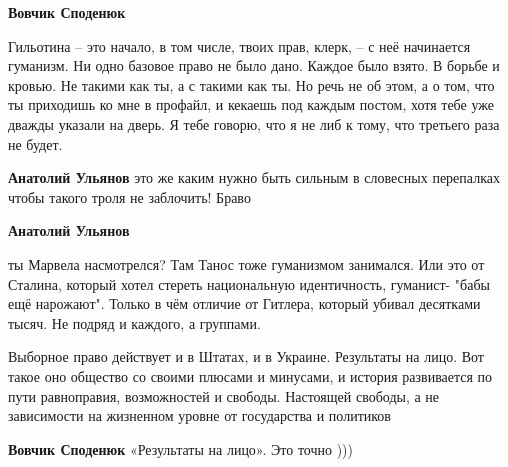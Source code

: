 \begin{itemize}
\begin{itemize}
\textbf{Вовчик Споденюк} 

Гильотина – это начало, в том числе, твоих прав, клерк, – с неё начинается
гуманизм. Ни одно базовое право не было дано. Каждое было взято. В борьбе и
кровью. Не такими как ты, а с такими как ты. Но речь не об этом, а о том, что
ты приходишь ко мне в профайл, и кекаешь под каждым постом, хотя тебе уже
дважды указали на дверь. Я тебе говорю, что я не либ к тому, что третьего раза
не будет.


 
\textbf{Анатолий Ульянов} это же каким нужно быть сильным в словесных перепалках чтобы такого троля не заблочить! Браво 👏

 
\textbf{Анатолий Ульянов} 

ты Марвела насмотрелся? Там Танос тоже гуманизмом занимался. Или это от
Сталина, который хотел стереть национальную идентичность, гуманист- "бабы ещё
нарожают". Только в чём отличие от Гитлера, который убивал десятками тысяч. Не
подряд и каждого, а группами.

Выборное право действует и в Штатах, и в Украине. Результаты на лицо. Вот такое
оно общество со своими плюсами и минусами, и история развивается по пути
равноправия, возможностей и свободы. Настоящей свободы, а не зависимости на
жизненном уровне от государства и политиков


 
\textbf{Вовчик Споденюк} «Результаты на лицо». Это точно )))

 

\end{itemize}
\end{itemize}
